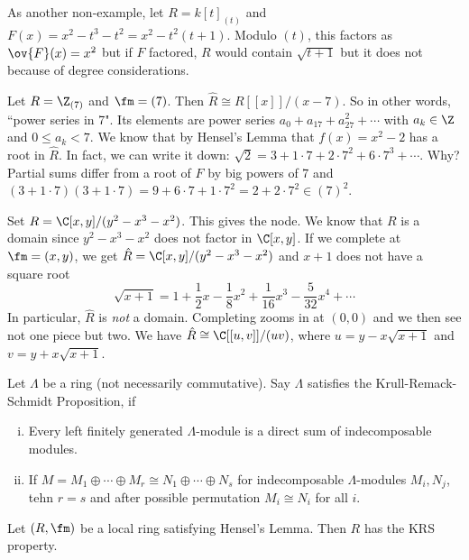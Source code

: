 \begin{ex}
As another non-example, let $R=k[t]_{(t)}$ and $F(x)=x^2-t^3-t^2=x^2-t^2(t+1)$. Modulo $(t)$, this factors as $\ov{F}(x)=x^2$ but if $F$ factored, $R$ would contain $\sqrt{t+1}$ but it does not because of degree considerations. 
\end{ex}

\begin{ex}
Let $R=\Z_{(7)}$ and $\fm=(7)$. Then $\hat{R} \cong R[[x]]/(x-7)$. So in other words, ``power series in 7". Its elements are power series $a_0+a_17+a_27^2+\cdots$ with $a_k \in \Z$ and $0 \leq a_k<7$. We know that by Hensel's Lemma that $f(x)=x^2-2$ has a root in $\hat{R}$. In fact, we can write it down: $\sqrt{2}=3+1\cdot 7+2 \cdot 7^2+ 6 \cdot 7^3+\cdots$. Why? Partial sums differ from a root of $F$ by big powers of 7 and $(3+1 \cdot 7)(3+1 \cdot 7)=9+6 \cdot 7+1 \cdot 7^2=2+2 \cdot 7^2 \in (7)^2$.
\end{ex}

\begin{ex}
Set $R=\C[x,y]/(y^2-x^3-x^2)$. This gives the node. We know that $R$ is a domain since $y^2-x^3-x^2$ does not factor in $\C[x,y]$. If we complete at $\fm=(x,y)$, we get $\hat{R}=\C[x,y]/(y^2-x^3-x^2)$ and $x+1$ does not have a square root
\[
\sqrt{x+1}=1+\frac{1}{2} x-\frac{1}{8} x^2+\frac{1}{16} x^3-\frac{5}{32} x^4+ \cdots
\]
In particular, $\hat{R}$ is \emph{not} a domain. Completing zooms in at $(0,0)$ and we then see not one piece but two. We have $\hat{R} \cong \C[[u,v]]/(uv)$, where $u=y-x\sqrt{x+1}$ and $v=y+x\sqrt{x+1}$. 
\end{ex}

\begin{dfn}
Let $\Lambda$ be a ring (not necessarily commutative). Say $\Lambda$ satisfies the Krull-Remack-Schmidt Proposition, if 
\begin{enumerate}[(i)]
\item Every left finitely generated $\Lambda$-module is a direct sum of indecomposable modules.
\item If $M=M_1\oplus \cdots \oplus M_r \cong N_1 \oplus \cdots \oplus N_s$ for indecomposable $\Lambda$-modules $M_i,N_j$, tehn $r=s$ and after possible permutation $M_i \cong N_i$ for all $i$. 
\end{enumerate}
\end{dfn}

\begin{prop}
Let $(R,\fm)$ be a local ring satisfying Hensel's Lemma. Then $R$ has the KRS property. 
\end{prop}

